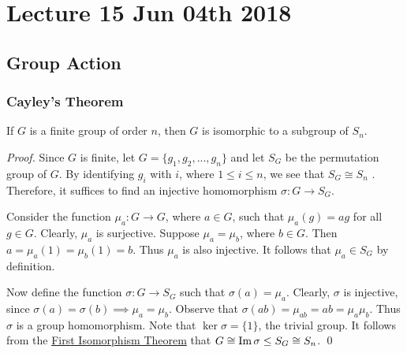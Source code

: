 \chapter{Lecture 15 Jun 04th 2018}%
\label{chp:lecture_15_jun_04th_2018}

\section{Group Action}%
\label{sec:group_action}

\subsection{Cayley's Theorem}%
\label{sub:cayley_s_theorem}

\begin{thm}
\label{thm:cayley_s_theorem}
  If $G$ is a finite group of order $n$, then $G$ is isomorphic to a subgroup of $S_n$.
\end{thm}

\begin{proof}
  Since $G$ is finite, let $G = \{g_1, g_2, ..., g_n\}$ and let $S_G$ be the permutation group of $G$. By identifying $g_i$ with $i$, where $1 \leq i \leq n$, we see that $S_G \cong S_n$ . Therefore, it suffices to find an injective homomorphism $\sigma : G \to S_G$.

  Consider the function $\mu_a : G \to G$, where $a \in G$, such that $\mu_a(g) = ag$ for all $g \in G$. Clearly, $\mu_a$ is surjective. Suppose $\mu_a = \mu_b$, where $b \in G$. Then $a = \mu_a (1) = \mu_b (1) = b$. Thus $\mu_a$ is also injective. It follows that $\mu_a \in S_G$ by definition.

  Now define the function $\sigma : G \to S_G$ such that $\sigma(a) = \mu_a$. Clearly, $\sigma$ is injective, since $\sigma(a) = \sigma(b) \implies \mu_a = \mu_b$. Observe that $\sigma(ab) = \mu_{ab} = ab = \mu_a \mu_b$. Thus $\sigma$ is a group homomorphism. Note that $\ker \sigma = \{1\}$, the trivial group. It follows from the \hyperref[thm:first_isomorphism_theorem]{First Isomorphism Theorem} that $G \cong \operatorname{Im} \sigma \leq S_G \cong S_n$.  \qed
\end{proof}

